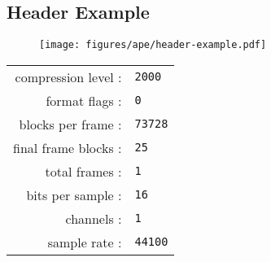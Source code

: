 \subsection{Header Example}
\begin{figure}[h]
\texttt{[image: figures/ape/header-example.pdf]}
\end{figure}
\begin{table}[h]
\begin{tabular}{rl}
compression level : & \texttt{2000} \\
format flags : & \texttt{0} \\
blocks per frame : & \texttt{73728} \\
final frame blocks : & \texttt{25} \\
total frames : & \texttt{1} \\
bits per sample : & \texttt{16} \\
channels : & \texttt{1} \\
sample rate : & \texttt{44100} \\
\end{tabular}
\end{table}
